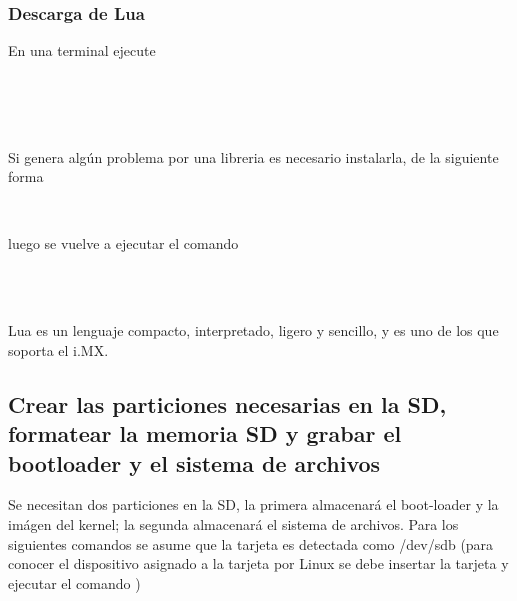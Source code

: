 \documentclass[12pt]{article}
\begin{document}
\subsubsection{Descarga de Lua}
\noindent
En una terminal ejecute
\begin{center}
 \\
 \\
 \\
\end{center}
\noindent
Si genera algún problema por una libreria es necesario instalarla, de la siguiente forma
\begin{center}
 \\
\end{center}
\noindent
luego se vuelve a ejecutar el comando
\begin{center}
 \\
 \\
\end{center}
\noindent
Lua es un lenguaje compacto, interpretado, ligero y sencillo, y es uno de los que soporta el i.MX.

\subsection{Crear las particiones necesarias en la SD, formatear la memoria SD y grabar el bootloader y el sistema de archivos}
\noindent
Se necesitan dos particiones en la SD, la primera almacenará el boot-loader y la imágen del kernel; la segunda almacenará el sistema de archivos. Para los siguientes comandos se asume que la tarjeta es detectada como /dev/sdb (para conocer el dispositivo asignado a la tarjeta por Linux se debe insertar la tarjeta y ejecutar el comando )
\end{document}
